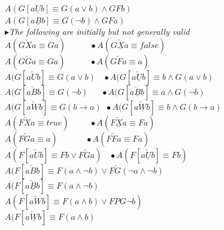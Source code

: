 \documentclass{article}
\begin{document}
\begin{multicols}{4}
$A(G[a \underline{U} b] \equiv G(a \vee b) \wedge GFb)$ \\
$A(G[a \underline{B} b] \equiv G(\neg b) \wedge GFa)$ \\
$\blacktriangleright $\textit{The following are initially but not generally valid} \\
$A(G\overleftarrow{X}a \equiv Ga)\ \ \ \ \ \ \ \ \ \ \ \ \ \bullet A(G\overleftarrow{\underline{X}}a \equiv false)$ \\
$A(G\overleftarrow{G}a \equiv Ga)\ \ \ \ \ \ \ \ \ \ \ \ \ \bullet A(G\overleftarrow{F}a \equiv a)$ \\
$A(G[a \overleftarrow{U} b] \equiv G(a \vee b)\ \ \ \ \bullet A(G[a \overleftarrow{\underline{U}} b] \equiv b \wedge G(a \vee b) $ \\
$A(G[a \overleftarrow{B} b] \equiv G(\neg b)\ \ \ \ \ \ \ \bullet A(G[a \overleftarrow{\underline{B}} b] \equiv a \wedge G(\neg b) $ \\
$A(G[a \overleftarrow{W} b] \equiv G(b \rightarrow a)\ \ \bullet A(G[a \overleftarrow{\underline{W}} b] \equiv b \wedge G(b \rightarrow a) $ \\
$A(F\overleftarrow{X}a \equiv true)\ \ \ \ \ \ \ \ \ \ \ \bullet A(F\overleftarrow{\underline{X}}a \equiv Fa)$ \\
$A(F\overleftarrow{G}a \equiv a)\ \ \ \ \ \ \ \ \ \ \ \ \ \ \ \bullet A(F\overleftarrow{F}a \equiv Fa)$ \\
$A(F[a \overleftarrow{U} b] \equiv Fb \vee F\overleftarrow{G}a)\ \ \ \ \bullet A(F[a \overleftarrow{\underline{U}} b] \equiv Fb)$ \\
$A(F[a \overleftarrow{B} b] \equiv F(a \wedge \neg b) \vee F\overleftarrow{G}(\neg a \wedge \neg b)$ \\
$A(F[a \overleftarrow{\underline{B}} b] \equiv F(a \wedge \neg b)$ \\
$A(F[a \overleftarrow{W} b] \equiv F(a \wedge b) \vee FPG\neg b)$ \\
$A(F[a \overleftarrow{\underline{W}} b] \equiv F(a \wedge b)$ \\ 


\end{multicols}
\end{document}
